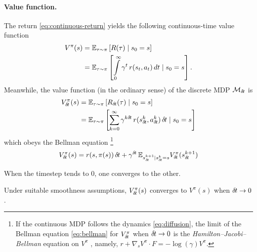 \paragraph{Value function.}
The return \eqref{eq:continuous-return} yields the
following continuous-time value function
\begin{align}
  V^\pi(s) &= \mathbb{E}_{\tau\sim\pi}\left[R(\tau) \mid s_0 = s\right]\\
  &= \mathbb{E}_{\tau\sim\pi}\left[\int\limits_{0}^\infty \gamma^{t}\, r(s_t,
  a_t) \,dt \mid s_0 = s\right].
\end{align}
Meanwhile, the value function (in the ordinary sense) of the discrete MDP ${\cal
M}_{\delta\hspace{-.1em}t}$ is
\begin{align}
  V^\pi_{\delta\hspace{-.1em}t}(s) &= \mathbb{E}_{\tau\sim\pi}\left[R_{\delta\hspace{-.1em}t}(\tau) \mid s_0 = s\right]\\
  &= \mathbb{E}_{\tau\sim\pi}\left[\sum\limits_{k=0}^\infty
  \gamma^{k{\delta\hspace{-.1em}t}}\,r(s^k_{{\delta\hspace{-.1em}t}}, a^k_{{\delta\hspace{-.1em}t}})\,{\delta\hspace{-.1em}t} \mid s_0 = s\right]
\end{align}
which obeys the Bellman equation
\footnote{
If the continuous MDP follows the dynamics \eqref{eq:diffusion}, the limit of
the Bellman equation \eqref{eq:bellman} for $V^\pi_{\delta\hspace{-.1em}t}$ when ${\delta\hspace{-.1em}t} \rightarrow 0$ is
the \emph{Hamilton--Jacobi--Bellman} equation on $V^\pi$ \cite{cont_rl},
namely,
  $r + \nabla_s V^\pi \cdot F = - \log(\gamma) V^\pi$.
}
\begin{equation}
  \label{eq:bellman}
  V^\pi_{\delta\hspace{-.1em}t}(s) = {r}(s, \pi(s))\,{\delta\hspace{-.1em}t} + \gamma^{{\delta\hspace{-.1em}t}}\, \mathbb{E}_{s_{{\delta\hspace{-.1em}t}}^{k+1} | s_{{\delta\hspace{-.1em}t}}^{k} = s} V^\pi_{\delta\hspace{-.1em}t}(s_{{\delta\hspace{-.1em}t}}^{k+1})
\end{equation}

When the timestep tends to $0$, one converges to the other.
  \begin{theorem}
    \label{th:conv-value}
Under suitable smoothness assumptions, $V^\pi_{\delta\hspace{-.1em}t}(s)$ converges to
$V^\pi(s)$ when ${\delta\hspace{-.1em}t}\to 0$.
   \end{theorem}

